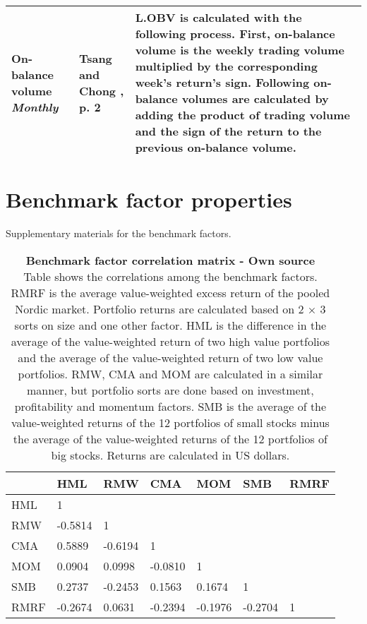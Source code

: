 \documentclass[12pt]{article}
\begin{document}
\begin{appendices}
{{\begin{xltabular}{\textwidth}{ >{\raggedright\arraybackslash}p{0.23\textwidth} >{\raggedright\arraybackslash}p{0.2\textwidth} X}
On-balance volume \newline \emph{Monthly} 	& Tsang and Chong \citeyearpar{tsang2009}, p. 2			& L.OBV is calculated with the following process. First, on-balance volume is the weekly trading volume multiplied by the corresponding week's return's sign. Following on-balance volumes are calculated by adding the product of trading volume and the sign of the return to the previous on-balance volume.\\ 
\bottomrule
\end{xltabular}
}}

\clearpage

\section{Benchmark factor properties} \label{BenchmarkFactorProperties}
\renewcommand{\thefigure}{B.\arabic{figure}}
\setcounter{figure}{0}
\renewcommand{\thetable}{B.\arabic{table}}
\setcounter{table}{0}

Supplementary materials for the benchmark factors. 

\begin{table}[H]
\footnotesize
\caption[Benchmark factor correlation matrix]{\textbf{Benchmark factor correlation matrix \textnormal{- Own source}}\\ Table shows the correlations among the benchmark factors. RMRF is the average value-weighted excess return of the pooled Nordic market. Portfolio returns are calculated based on 2 × 3 sorts on size and one other factor. HML is the difference in the average of the value-weighted return of two high value portfolios and the average of the value-weighted return of two low value portfolios. RMW, CMA and MOM are calculated in a similar manner, but portfolio sorts are done based on investment, profitability and momentum factors. SMB is the average of the value-weighted returns of the 12 portfolios of small stocks minus the average of the value-weighted returns of the 12 portfolios of big stocks. Returns are calculated in US dollars.}
\label{table:FFfactorsCorrelations}
\centering
{}
\begin{tabularx}{\textwidth}{@{\extracolsep{4pt}} X Y Y Y Y Y Y} 
\toprule
& HML & RMW & CMA & MOM & SMB & RMRF \\
\midrule
HML & 1 &  &  &  & &  \\
RMW & -0.5814 & 1 &  &  &  &  \\
CMA & 0.5889 & -0.6194 & 1 &  &  &  \\
MOM & 0.0904 & 0.0998 & -0.0810 & 1 &  &  \\
SMB & 0.2737 & -0.2453 & 0.1563 & 0.1674 & 1 &  \\
RMRF & -0.2674 & 0.0631 & -0.2394 & -0.1976 & -0.2704 & 1 \\
\bottomrule
\end{tabularx}
\end{table}


\end{appendices}
\end{document}

